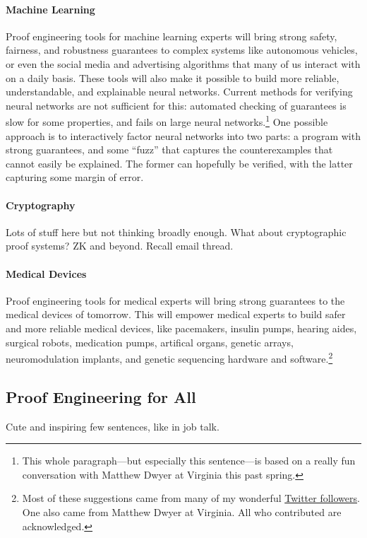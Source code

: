 \paragraph{Machine Learning}
Proof engineering tools for machine learning experts will bring strong safety, fairness, and robustness guarantees to
complex systems like autonomous vehicles, or even the social media and advertising algorithms that many of us interact with
on a daily basis. These tools will also make it possible to build more reliable, understandable, and explainable neural networks.
Current methods for verifying neural networks are not sufficient for this: 
automated checking of guarantees is slow for some properties, and fails on large 
neural networks.\footnote{This whole paragraph---but especially this sentence---is based on a really fun conversation with Matthew Dwyer at Virginia this past spring.}
One possible approach is to interactively factor neural networks into two parts: a program with strong guarantees,
and some ``fuzz'' that captures the counterexamples that cannot easily be explained.
The former can hopefully be verified, with the latter capturing some margin of error.

\paragraph{Cryptography} Lots of stuff here but not thinking broadly enough. What about cryptographic proof systems? ZK and beyond. Recall email thread.

\paragraph{Medical Devices} 
Proof engineering tools for medical experts will bring strong guarantees to the medical devices of tomorrow.
This will empower medical experts to build safer and more reliable medical devices,
like pacemakers, insulin pumps, hearing aides, surgical robots, medication pumps, artifical organs,
genetic arrays, neuromodulation implants, and genetic sequencing hardware and 
software.\footnote{Most of these suggestions came from many of my wonderful \href{https://twitter.com/TaliaRinger/status/1388282607926857731}{Twitter followers}.
One also came from Matthew Dwyer at Virginia. All who contributed are acknowledged.}


\subsection*{Proof Engineering for All}

Cute and inspiring few sentences, like in job talk.

